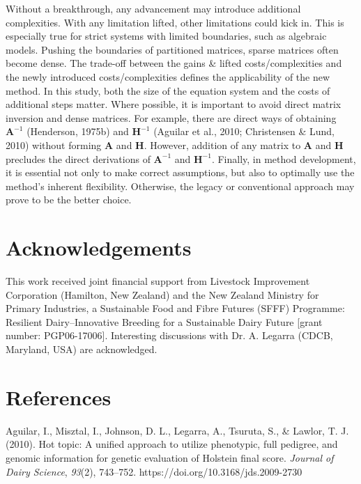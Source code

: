 \documentclass[authordate, empirical]{jote-new-article}
\begin{document}
	Without a breakthrough, any advancement may introduce additional complexities. With any limitation lifted, other limitations could kick in. This is especially true for strict systems with limited boundaries, such as algebraic models. Pushing the boundaries of partitioned matrices, sparse matrices often become dense. The trade-off between the gains \& lifted costs/complexities and the newly introduced costs/complexities defines the applicability of the new method. In this study, both the size of the equation system and the costs of additional steps matter. Where possible, it is important to avoid direct matrix inversion and dense matrices. For example, there are direct ways of obtaining $\textbf{A}^{-1}$ (Henderson, 1975b) and $\textbf{H}^{-1}$ (Aguilar et al., 2010; Christensen \& Lund, 2010) without forming \textbf{A} and \textbf{H}. However, addition of any matrix to \textbf{A} and \textbf{H} precludes the direct derivations of $\textbf{A}^{-1}$ and $\textbf{H}^{-1}$. Finally, in method development, it is essential not only to make correct assumptions, but also to optimally use the method's inherent flexibility. Otherwise, the legacy or conventional approach may prove to be the better choice.



	\section{Acknowledgements}



	This work received joint financial support from Livestock Improvement Corporation (Hamilton, New Zealand) and the New Zealand Ministry for Primary Industries, a Sustainable Food and Fibre Futures (SFFF) Programme: Resilient Dairy--Innovative Breeding for a Sustainable Dairy Future [grant number: PGP06-17006]. Interesting discussions with Dr. A. Legarra (CDCB, Maryland, USA) are acknowledged.



	\section{References}



	Aguilar, I., Misztal, I., Johnson, D. L., Legarra, A., Tsuruta, S., \& Lawlor, T. J. (2010). Hot topic: A unified approach to utilize phenotypic, full pedigree, and genomic information for genetic evaluation of Holstein final score. \emph{Journal of Dairy Science}, \emph{93}(2), 743--752. https://doi.org/10.3168/jds.2009-2730
\end{document}

